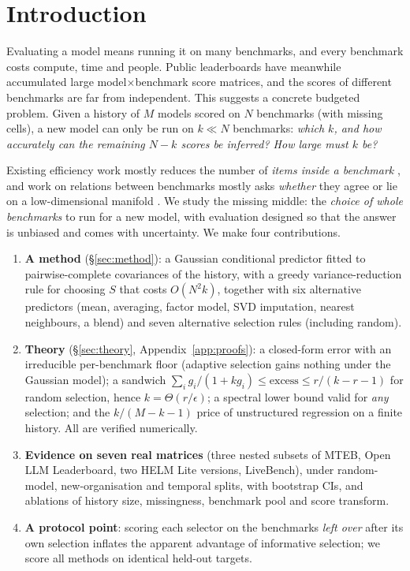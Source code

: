 \section{Introduction}
\label{sec:intro}

Evaluating a model means running it on many benchmarks, and every benchmark costs compute, time and people. Public leaderboards have meanwhile accumulated large model$\times$benchmark score matrices, and the scores of different benchmarks are far from independent. This suggests a concrete budgeted problem. Given a history of $M$ models scored on $N$ benchmarks (with missing cells), a new model can only be run on $k\ll N$ benchmarks: \emph{which $k$, and how accurately can the remaining $N-k$ scores be inferred? How large must $k$ be?}

Existing efficiency work mostly reduces the number of \emph{items inside a benchmark} \citep{vivek2024anchor,polo2024tiny,kipnis2024metabench,perlitz2024efficient}, and work on relations between benchmarks mostly asks \emph{whether} they agree or lie on a low-dimensional manifold \citep{perlitz2024benchbench,ruan2024observational,polo2024sloth}. We study the missing middle: the \emph{choice of whole benchmarks} to run for a new model, with evaluation designed so that the answer is unbiased and comes with uncertainty. We make four contributions.
\begin{enumerate}[leftmargin=1.5em,itemsep=1pt,topsep=1pt]
\item \textbf{A method} (\S\ref{sec:method}): a Gaussian conditional predictor fitted to pairwise-complete covariances of the history, with a greedy variance-reduction rule for choosing $S$ that costs $O(N^2k)$, together with six alternative predictors (mean, averaging, factor model, SVD imputation, nearest neighbours, a blend) and seven alternative selection rules (including random).
\item \textbf{Theory} (\S\ref{sec:theory}, Appendix~\ref{app:proofs}): a closed-form error with an irreducible per-benchmark floor (adaptive selection gains nothing under the Gaussian model); a sandwich $\sum_i g_i/(1+kg_i)\le\text{excess}\le r/(k-r-1)$ for random selection, hence $k=\Theta(r/\epsilon)$; a spectral lower bound valid for \emph{any} selection; and the $k/(M-k-1)$ price of unstructured regression on a finite history. All are verified numerically.
\item \textbf{Evidence on seven real matrices} (three nested subsets of MTEB, Open LLM Leaderboard, two HELM Lite versions, LiveBench), under random-model, new-organisation and temporal splits, with bootstrap CIs, and ablations of history size, missingness, benchmark pool and score transform.
\item \textbf{A protocol point}: scoring each selector on the benchmarks \emph{left over} after its own selection inflates the apparent advantage of informative selection; we score all methods on identical held-out targets.
\end{enumerate}

